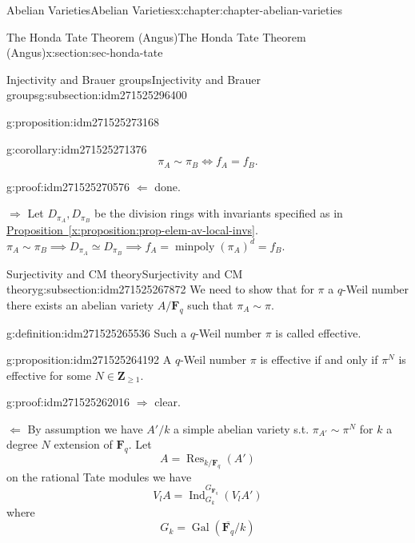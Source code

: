 \documentclass[oneside,10pt,]{book}
\numberwithin{equation}{section}
\newcommand{\ZZ}{\mathbf{Z}}
\newcommand{\FF}{\mathbf{F}}
\newcommand{\Gal}[2]{\operatorname{Gal}(#1/#2)}
\DeclareMathOperator{\Ind}{Ind}
\DeclareMathOperator{\Res}{Res}
\begin{document}
\begin{chapterptx}{Abelian Varieties}{}{Abelian Varieties}{}{}{x:chapter:chapter-abelian-varieties}
\begin{sectionptx}{The Honda Tate Theorem (Angus)}{}{The Honda Tate Theorem (Angus)}{}{}{x:section:sec-honda-tate}
\begin{subsectionptx}{Injectivity and Brauer groups}{}{Injectivity and Brauer groups}{}{}{g:subsection:idm271525296400}
\begin{proposition}{}{}{g:proposition:idm271525273168}
\end{proposition}
\begin{corollary}{}{}{g:corollary:idm271525271376}%
%
\begin{equation*}
\pi_A\sim \pi_B \iff f_A = f_B\text{.}
\end{equation*}
%
\end{corollary}
\begin{proofptx}{}{g:proof:idm271525270576}
\(\Leftarrow\) done.%
\par
\(\Rightarrow\) Let \(D_{\pi_A} , D_{\pi_B}\) be the division rings with invariants specified as in \hyperref[x:proposition:prop-elem-av-local-invs]{Proposition~\ref{x:proposition:prop-elem-av-local-invs}}. \(\pi_A\sim \pi_B \implies D_{\pi_A} \simeq D_{\pi_B} \implies f_A = \operatorname{minpoly}(\pi_A) ^d = f_B\).%
\end{proofptx}
\end{subsectionptx}
%
%
\typeout{************************************************}
\typeout{************************************************}
%
\begin{subsectionptx}{Surjectivity and CM theory}{}{Surjectivity and CM theory}{}{}{g:subsection:idm271525267872}
We need to show that for \(\pi\) a \(q\)-Weil number there exists an abelian variety \(A/\FF_q\) such that \(\pi_A \sim \pi\).%
\begin{definition}{}{g:definition:idm271525265536}%
Such a \(q\)-Weil number \(\pi\) is called effective.%
\end{definition}
\begin{proposition}{}{}{g:proposition:idm271525264192}%
A \(q\)-Weil number \(\pi\) is effective if and only if \(\pi^N\) is effective for some \(N\in \ZZ_{\ge 1}\).%
\end{proposition}
\begin{proofptx}{}{g:proof:idm271525262016}
\(\Rightarrow\) clear.%
\par
\(\Leftarrow\) By assumption we have \(A'/k\) a simple abelian variety s.t. \(\pi_{A'} \sim  \pi^N\) for \(k\) a degree \(N\) extension of \(\FF_q\). Let%
\begin{equation*}
A = \Res_{k/\FF_q}(A')
\end{equation*}
on the rational Tate modules we have%
\begin{equation*}
V_l A = \Ind_{G_k}^{G_{\FF_q}} (V_lA')
\end{equation*}
where%
\begin{equation*}
G_k = \Gal{\overline{\FF_q}}{k}

\end{equation*}
\end{proofptx}
\end{subsectionptx}
\end{sectionptx}
\end{chapterptx}
\end{document}
